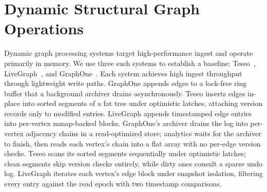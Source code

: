 \section{Dynamic Structural Graph Operations}
\label{sec:eval:dynamic}


Dynamic graph processing systems target high-performance
ingest and operate primarily in memory.
We use three such systems to establish a baseline:
Teseo~\cite{teseo2021deLeo}, LiveGraph~\cite{zhu2019livegraph}, and
GraphOne~\cite{graphone2019kumar}.
Each system achieves high ingest throughput through lightweight write paths.
GraphOne appends edges to a lock-free ring buffer that a background archiver drains asynchronously.
Teseo inserts edges in-place into sorted segments of a fat tree under optimistic latches, attaching version records only to modified entries.
LiveGraph appends timestamped edge entries into per-vertex mmap-backed blocks.
GraphOne's archiver drains the log into per-vertex adjacency chains in a read-optimized store; analytics waits for the archiver to finish, then reads each vertex's chain into a flat array with no per-edge version checks.
Teseo scans its sorted segments sequentially under optimistic latches; clean segments skip version checks entirely, while dirty ones consult a sparse undo log.
LiveGraph iterates each vertex's edge block under snapshot isolation, filtering every entry against the read epoch with two timestamp comparisons.


